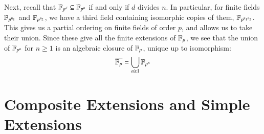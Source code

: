 \documentclass[12pt, a4paper, oneside, openright, titlepage]{book}
\begin{document}
Next, recall that $\mathbb F_{p^d} \subseteq \mathbb F_{p^n}$ if and only if $d$ divides $n$. In particular, for finite fields $\mathbb F_{p^{n_1}}$ and $\mathbb F_{p^{n_2}}$, we have a third field containing isomorphic copies of them, $\mathbb F_{p^{n_1n_2}}$. This gives us a partial ordering on finite fields of order $p$, and allows us to take their union. Since these give all the finite extensions of $\mathbb F_p$, we see that the union of $\mathbb F_{p^n}$ for $n \geq 1$ is an algebraic closure of $\mathbb F_p$, unique up to isomorphism: \begin{equation*}
    \overline{\mathbb F_p} = \bigcup_{n\geq 1}\mathbb F_{p^n}
\end{equation*}




\section{\textsection Composite Extensions and Simple Extensions}
\end{document}
